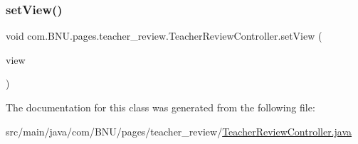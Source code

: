 \subsubsection{\texorpdfstring{set\+View()}{setView()}}
{\footnotesize\ttfamily void com.\+B\+N\+U.\+pages.\+teacher\+\_\+review.\+Teacher\+Review\+Controller.\+set\+View (\begin{DoxyParamCaption}\item[{\mbox{\hyperlink{classcom_1_1_b_n_u_1_1pages_1_1teacher__review_1_1_teacher_review_view}{Teacher\+Review\+View}}}]{view }\end{DoxyParamCaption})}



The documentation for this class was generated from the following file\+:\begin{DoxyCompactItemize}
\item 
src/main/java/com/\+B\+N\+U/pages/teacher\+\_\+review/\mbox{\hyperlink{_teacher_review_controller_8java}{Teacher\+Review\+Controller.\+java}}\end{DoxyCompactItemize}

